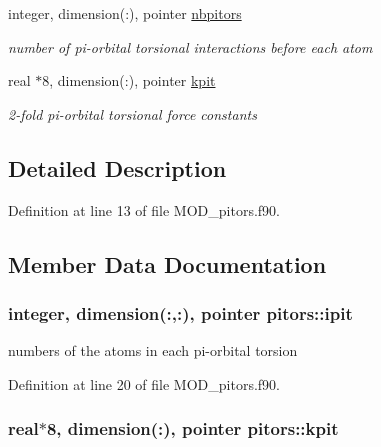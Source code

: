 \begin{DoxyCompactItemize}
integer, dimension(\-:), pointer \hyperlink{classpitors_a53b9c40a373f8b7c84a14a469cc56488}{nbpitors}
\begin{DoxyCompactList}\small\item\em number of pi-\/orbital torsional interactions before each atom \end{DoxyCompactList}\item 
real $\ast$8, dimension(\-:), pointer \hyperlink{classpitors_a6c5f386d60f7e888c44201434a0e60e1}{kpit}
\begin{DoxyCompactList}\small\item\em 2-\/fold pi-\/orbital torsional force constants \end{DoxyCompactList}\end{DoxyCompactItemize}


\subsection{Detailed Description}


Definition at line 13 of file M\-O\-D\-\_\-pitors.\-f90.



\subsection{Member Data Documentation}
\hypertarget{classpitors_a25344f75e9e9d0d8044761881ac3e89d}{
\subsubsection[{ipit}]{\setlength{\rightskip}{0pt plus 5cm}integer, dimension(\-:,\-:), pointer pitors\-::ipit}}\label{classpitors_a25344f75e9e9d0d8044761881ac3e89d}


numbers of the atoms in each pi-\/orbital torsion 



Definition at line 20 of file M\-O\-D\-\_\-pitors.\-f90.

\hypertarget{classpitors_a6c5f386d60f7e888c44201434a0e60e1}{
\subsubsection[{kpit}]{\setlength{\rightskip}{0pt plus 5cm}real$\ast$8, dimension(\-:), pointer pitors\-::kpit}}\label{classpitors_a6c5f386d60f7e888c44201434a0e60e1}


